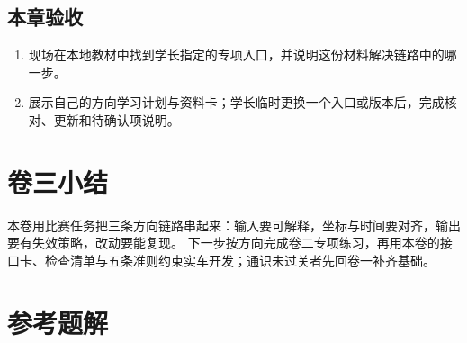 \documentclass[
  lang=cn,
  scheme=chinese,
  chinesefont=ctexfont,
  11pt,
  oneside,
  device=normal,
  color=cyan,
  mode=fancy
]{elegantbook}
\begin{document}
\section{本章验收}
\begin{enumerate}
  \item 现场在本地教材中找到学长指定的专项入口，并说明这份材料解决链路中的哪一步。
  \item 展示自己的方向学习计划与资料卡；学长临时更换一个入口或版本后，完成核对、更新和待确认项说明。
\end{enumerate}

\chapter*{卷三小结}
本卷用比赛任务把三条方向链路串起来：输入要可解释，坐标与时间要对齐，输出要有失效策略，改动要能复现。
下一步按方向完成卷二专项练习，再用本卷的接口卡、检查清单与五条准则约束实车开发；通识未过关者先回卷一补齐基础。

\chapter*{参考题解}

\end{document}
